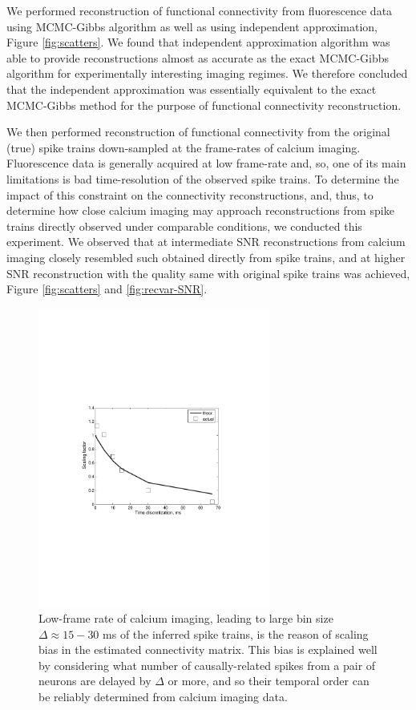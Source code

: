 We performed reconstruction of functional connectivity from fluorescence data using MCMC-Gibbs algorithm as well as using independent approximation, Figure \ref{fig:scatters}. We found that independent approximation algorithm was able to provide reconstructions almost as accurate as the exact MCMC-Gibbs algorithm for experimentally interesting imaging regimes. We therefore concluded that the independent approximation was essentially equivalent to the exact MCMC-Gibbs method for the purpose of functional connectivity reconstruction.

We then performed reconstruction of functional connectivity from the original (true) spike trains down-sampled at the frame-rates of calcium imaging.
Fluorescence data is generally acquired at low frame-rate and, so, one of its main limitations is bad time-resolution of the observed spike trains. To determine the impact of this constraint on the connectivity reconstructions, and, thus, to determine how close calcium imaging may approach  reconstructions from spike trains directly observed under comparable conditions, we conducted this experiment.
We observed that at intermediate SNR reconstructions from calcium imaging closely resembled such obtained directly from spike trains, and at higher SNR reconstruction with the quality same with original spike trains was achieved, Figure \ref{fig:scatters} and \ref{fig:recvar-SNR}.

\begin{figure}[h]
\centering
\includegraphics[width=3in]{../figs/FigureA4_scale_bias}
\caption{Low-frame rate of calcium imaging, leading to large bin size $\Delta\approx 15-30$ ms of the inferred spike trains, is the reason of scaling bias in the estimated connectivity matrix.
This bias is explained well by considering what number of causally-related spikes from
a pair of neurons are delayed by $\Delta$ or more, and so their temporal order can be reliably determined from calcium imaging data.}
\label{fig:bias}
\end{figure}

